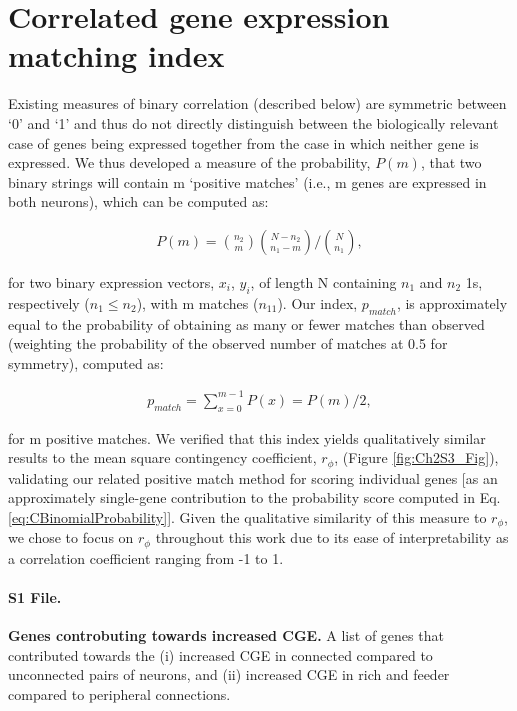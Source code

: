 \section{Correlated gene expression matching index}
\label{app:AppendixCh2_3}

Existing measures of binary correlation (described below) are symmetric between ‘0’ and ‘1’ and thus do not directly distinguish between the biologically relevant case of genes being expressed together from the case in which neither gene is expressed. We thus developed a measure of the probability, $P(m)$, that two binary strings will contain m ‘positive matches’ (i.e., m genes are expressed in both neurons), which can be computed as:


\begin{eqnarray}
	\label{eq:S3}
     P(m) = \binom{n_{2}}{m}\binom{N-n_{2}}{n_{1}-m}/\binom{N}{n_{1}},
\end{eqnarray}

for two binary expression vectors, $x_{i}$, $y_{i}$, of length N containing $n_{1}$ and $n_{2}$ 1s, respectively ($n_{1} \leq n_{2}$), with m matches ($n_{11}$). Our index, $p_{match}$, is approximately equal to the probability of obtaining as many or fewer matches than observed (weighting the probability of the observed number of matches at 0.5 for symmetry), computed as:

\begin{eqnarray}
	\label{eq:S4}
     p_{match} = \sum_{x=0}^{m-1}P(x)=P(m)/2,
\end{eqnarray}

for m positive matches.
	We verified that this index yields qualitatively similar results to the mean square contingency coefficient, $r_\phi$, (Figure \ref{fig:Ch2S3_Fig}), validating our related positive match method for scoring individual genes [as an approximately single-gene contribution to the probability score computed in Eq. \ref{eq:CBinomialProbability}].
Given the qualitative similarity of this measure to $r_\phi$, we chose to focus on $r_\phi$ throughout this work due to its ease of interpretability as a correlation coefficient ranging from -1 to 1.

\paragraph*{S1 File.}
\label{file:geneList}
{\bf Genes controbuting towards increased CGE.}
A list of genes that contributed towards the (i) increased CGE in connected compared to unconnected pairs of neurons, and (ii) increased CGE in rich and feeder compared to peripheral connections.

